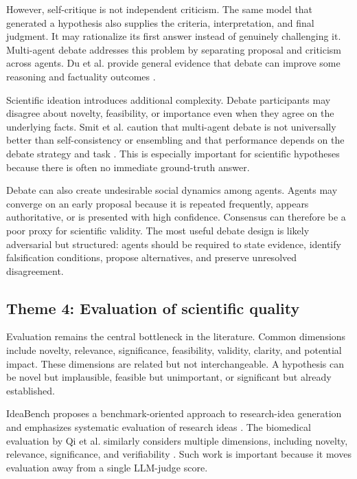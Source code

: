\documentclass[11pt]{article}
\begin{document}
However, self-critique is not independent criticism. The same model that generated a hypothesis
also supplies the criteria, interpretation, and final judgment. It may rationalize its first answer
instead of genuinely challenging it. Multi-agent debate addresses this problem by separating
proposal and criticism across agents. Du et al. provide general evidence that debate can improve
some reasoning and factuality outcomes \cite{du2024improving}.

Scientific ideation introduces additional complexity. Debate participants may disagree about
novelty, feasibility, or importance even when they agree on the underlying facts. Smit et al. caution
that multi-agent debate is not universally better than self-consistency or ensembling and that
performance depends on the debate strategy and task \cite{smit2024mad}. This is especially
important for scientific hypotheses because there is often no immediate ground-truth answer.

Debate can also create undesirable social dynamics among agents. Agents may converge on an early
proposal because it is repeated frequently, appears authoritative, or is presented with high
confidence. Consensus can therefore be a poor proxy for scientific validity. The most useful debate
design is likely adversarial but structured: agents should be required to state evidence, identify
falsification conditions, propose alternatives, and preserve unresolved disagreement.

\subsection{Theme 4: Evaluation of scientific quality}
\label{subsec:evaluation-quality}

Evaluation remains the central bottleneck in the literature. Common dimensions include novelty,
relevance, significance, feasibility, validity, clarity, and potential impact. These dimensions are
related but not interchangeable. A hypothesis can be novel but implausible, feasible but
unimportant, or significant but already established.

IdeaBench proposes a benchmark-oriented approach to research-idea generation and emphasizes
systematic evaluation of research ideas \cite{guo2025ideabench}. The biomedical evaluation by Qi
et al. similarly considers multiple dimensions, including novelty, relevance, significance, and
verifiability \cite{qi2024biomedical}. Such work is important because it moves evaluation away
from a single LLM-judge score.
\end{document}
